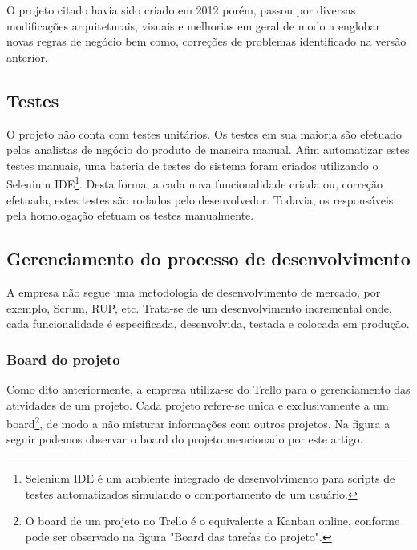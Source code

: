 \documentclass[11pt, a4paper]{article}
\begin{document}
O projeto citado havia sido criado em 2012 porém, passou por diversas modificações arquiteturais, visuais e melhorias em geral de modo a englobar novas regras de negócio bem como, correções de problemas identificado na versão anterior.

\subsection{Testes}
O projeto não conta com testes unitários. Os testes em sua maioria são efetuado pelos analistas de negócio do produto de maneira manual. Afim automatizar estes testes manuais, uma bateria de testes do sistema foram criados utilizando o Selenium IDE\footnote{Selenium IDE é um ambiente integrado de desenvolvimento para scripts de testes automatizados simulando o comportamento de um usuário.}. Desta forma, a cada nova funcionalidade criada ou, correção efetuada, estes testes são rodados pelo desenvolvedor. Todavia, os responsáveis pela homologação efetuam os testes manualmente.

\subsection{Gerenciamento do processo de desenvolvimento}
A empresa não segue uma metodologia de desenvolvimento de mercado, por exemplo, Scrum, RUP, etc. Trata-se de um desenvolvimento incremental onde, cada funcionalidade é especificada, desenvolvida, testada e colocada em produção.

\subsubsection{Board do projeto}

Como dito anteriormente, a empresa utiliza-se do Trello para o gerenciamento das atividades de um projeto. Cada projeto refere-se unica e exclusivamente a um board\footnote{O board de um projeto no Trello é o equivalente a Kanban online, conforme pode ser observado na figura "Board das tarefas do projeto".}, de modo a não misturar informações com outros projetos. Na figura a seguir podemos observar o board do projeto mencionado por este artigo.
\end{document}
